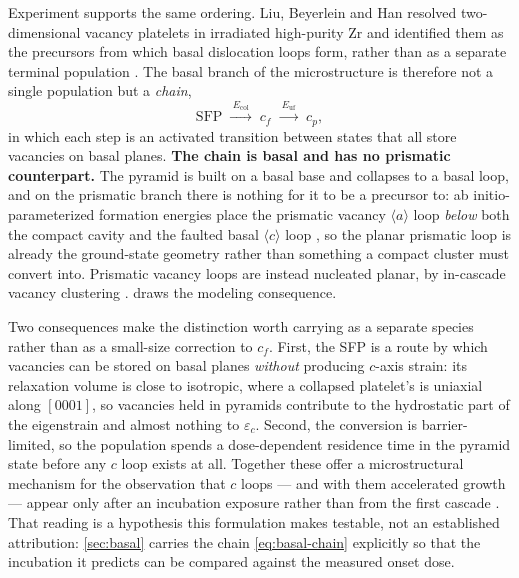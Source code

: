 \documentclass{article}
\newcommand{\aloop}{\ensuremath{\langle a\rangle}}
\newcommand{\cloop}{\ensuremath{\langle c\rangle}}
\begin{document}
Experiment supports the same ordering. Liu, Beyerlein and Han resolved
two-dimensional vacancy platelets in irradiated high-purity Zr and identified
them as the precursors from which basal dislocation loops form, rather than as a
separate terminal population \citep{liu2020two}. The basal branch of the
microstructure is therefore not a single population but a \emph{chain},
\begin{equation}
  \text{SFP}\;\xrightarrow{\;E_{\mathrm{col}}\;}\;
  c_f\;\xrightarrow{\;E_{\mathrm{uf}}\;}\;c_p ,
  \label{eq:basal-chain}
\end{equation}
in which each step is an activated transition between states that all store
vacancies on basal planes. \textbf{The chain is basal and has no prismatic
counterpart.} The pyramid is built on a basal base and collapses to a basal loop,
and on the prismatic branch there is nothing for it to be a precursor to: ab
initio-parameterized formation energies place the prismatic vacancy \aloop{} loop
\emph{below} both the compact cavity and the faulted basal \cloop{} loop
\citep{varvenne2014vacancy}, so the planar prismatic loop is already the
ground-state geometry rather than something a compact cluster must convert into.
Prismatic vacancy loops are instead nucleated planar, by in-cascade vacancy
clustering \citep{marchrico2025}.  draws the modeling
consequence.

Two consequences make the distinction worth carrying as a separate species
rather than as a small-size correction to $c_f$. First, the SFP is a route by
which vacancies can be stored on basal planes \emph{without} producing $c$-axis
strain: its relaxation volume is close to isotropic, where a collapsed platelet's
is uniaxial along $[0001]$, so vacancies held in pyramids contribute to the
hydrostatic part of the eigenstrain and almost nothing to $\varepsilon_c$.
Second, the conversion is barrier-limited, so the population spends a
dose-dependent residence time in the pyramid state before any $c$ loop exists at
all. Together these offer a microstructural mechanism for the observation that
$c$ loops --- and with them accelerated growth --- appear only after an incubation
exposure rather than from the first cascade
\citep{griffiths1988review,holt1986c,tournadre2012experimental}. That reading is
a hypothesis this formulation makes testable, not an established attribution:
\cref{sec:basal} carries the chain \cref{eq:basal-chain} explicitly so that the
incubation it predicts can be compared against the measured onset dose.
\end{document}
